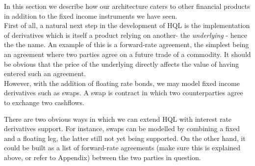 In this section we describe how our architecture caters to other financial 
products in addition to the fixed income instruments we have seen.\\

First of all, a natural next step in the development of HQL is the 
implementation of derivatives which is itself a product relying on another- the 
\emph{underlying} - hence the the name. An example of this is 
a forward-rate agreement, the simplest being an agreement where two parties 
agree on a future trade of a commodity. It should be obvious that the price of 
the underlying directly affects the value of having entered such an agreement.\\

However, with the addition of floating rate bonds, we may model fixed income 
derivatives such as swaps. A swap is contract in which two counterparties agree 
to exchange two cashflows.


There are two obvious ways in which we can extend HQL with interest rate 
derivatives support. For instance, swaps can be modelled by combining a fixed 
and a floating leg, the latter still not yet being supported. On the other 
hand, it could be built as a list of forward-rate agreements (make sure this is 
explained above, or refer to Appendix) between the two parties in question.

